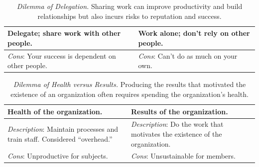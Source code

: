 \begin{center}
\begin{table}[H] %
\begin{tabular}{ | m{\dilemmatablewidth}| m{\dilemmatablewidth} | } 
  \hline
  \textbf{Delegate; share work with other people.} & 
  \textbf{Work alone; don't rely on other people.} \\ 
  \hline
  \textit{Cons}: Your success is dependent on other people. & 
  \textit{Cons}: Can't do as much on your own. \\  
  \hline
\end{tabular}
\caption{
\textit{Dilemma of Delegation.}
Sharing work can improve productivity and build relationships but also incurs risks to reputation and success.
}
\label{table:dilemma-personal-delegate-or-not}
\end{table}
\end{center}



\begin{center}
\begin{table}[H] %
\begin{tabular}{ | m{\dilemmatablewidth}| m{\dilemmatablewidth} | } 
  \hline
  \textbf{Health of the organization.} & 
  \textbf{Results of the organization.} \\ 
  \hline
  \textit{Description}: Maintain processes and train staff. Considered ``overhead.'' & 
  \textit{Description}: Do the work that motivates the existence of the organization. \\  
    \hline
  \textit{Cons}: Unproductive for subjects. & 
  \textit{Cons}: Unsustainable for members. \\
  \hline
\end{tabular}
\caption{
\textit{Dilemma of Health versus Results.}
 Producing the results that motivated the existence of an organization often requires spending the organization's health.
}
\label{table:dilemma-personal-health-vs-results}
\end{table}
\end{center}

